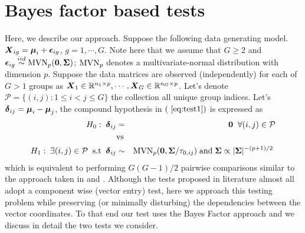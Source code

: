 \documentclass[12pt]{article}
\theoremstyle{plain}%
\theoremstyle{definition}
\def\bzero{{\mathbf 0}}
\newcommand{\uzero}            {\mbox{\boldmath$0$}}
\def\MVN{\hbox{MVN}}
\def\be{\begin{eqnarray}}
\def\ee{\end{eqnarray}}
\def\bzero{{\mathbf 0}}
\newcommand{\uS}       {\mbox{\boldmath$S$}}
\newcommand{\uX}       {\mbox{\boldmath$X$}}
\newcommand{\udelta}            {\mbox{\boldmath$\delta$}}
\newcommand{\uepsilon}          {\mbox{\boldmath$\epsilon$}}
\newcommand{\umu}               {\mbox{\boldmath$\mu$}}
\newcommand{\uSigma}            {\mbox{\boldmath$\Sigma$}}
\begin{document}

\section{Bayes factor based tests} \label{sec:test}
Here, we describe our approach. Suppose the following data generating model. $\uX_{ig} = \umu_i + \uepsilon_{ig}$, $g = 1, \cdots, G$.
 Note here that we assume that $G \geq 2$ and $\uepsilon_{ig} \stackrel{iid}{\sim} \MVN_{p}(\bzero, \uSigma)$; $\MVN_{p}$ denotes a multivariate-normal distribution with dimension $p$. Suppose the data matrices are observed (independently) for each of $G> 1$ groups as $\uX_1 \in \mathbb{R}^{n_1 \times p}, \cdots,  \uX_G \in \mathbb{R}^{n_G \times p}$. 
Let's denote $\mathcal{P} = \{(i,j): 1 \leq i < j \leq G \}$ the collection all unique group indices. %
Let's $\udelta_{ij} = \umu_i - \umu_j$, the compound hypothesis in $(~\ref{eq:test1})$ is expressed as
\be
H_0:\; \udelta_{ij} &=& \uzero\;\;\forall (i,j) \in \mathcal{P} \nonumber \\
 &\mbox{vs}& \nonumber \\
 H_1: \; \exists (i,j) \in \mathcal{P}\;\; \mbox{s.t}\;\; \udelta_{ij} &\sim& \MVN_{p}(\uzero, \uSigma/\tau_{0,ij})\; \text{and}\; \uSigma \propto |\uSigma|^{-(p+1)/2} \; \label{eq:hyp1}
\ee
which is equivalent to performing $G(G-1)/2$ pairwise comparisons similar to the approach taken in \cite{tony2014two} and \cite{ahmad2014u}. Although the tests proposed in literature almost all adopt a component wise (vector entry) test, here we approach this testing problem while preserving (or minimally disturbing) the dependencies between the vector coordinates. To that end our test uses the Bayes Factor approach and we discuss in detail the two tests we consider.
\end{document}
